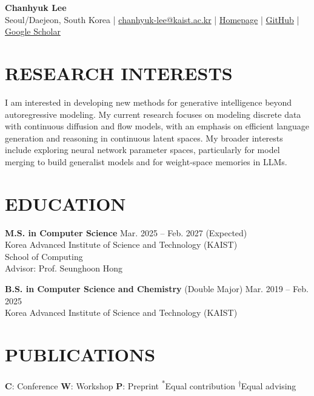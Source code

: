 \documentclass[a4paper,10pt]{extarticle}
\newcommand{\entryskip}{\smallskip}
\begin{document}
\fontsize{9.5}{11.4}\selectfont

\pagestyle{empty}

\begin{center}
    \textbf{\Large Chanhyuk Lee}\\[3pt]
    Seoul/Daejeon, South Korea | \href{mailto:chanhyuk-lee@kaist.ac.kr}{chanhyuk-lee@kaist.ac.kr} | \href{https://david3684.github.io}{Homepage} | \href{https://github.com/david3684}{GitHub} | \href{https://scholar.google.com/citations?user=mpSpDHcAAAAJ}{Google Scholar}
\end{center}

\section*{RESEARCH INTERESTS}
I am interested in developing new methods for generative intelligence beyond
autoregressive modeling. My current research focuses on modeling discrete data
with continuous diffusion and flow models, with an emphasis on efficient
language generation and reasoning in continuous latent spaces.
My broader interests include exploring neural network parameter spaces,
particularly for model merging to build generalist models and for weight-space
memories in LLMs.

\section*{EDUCATION}
\textbf{M.S. in Computer Science} \hfill Mar. 2025 -- Feb. 2027 (Expected) \\
Korea Advanced Institute of Science and Technology (KAIST) \\
School of Computing \\
Advisor: Prof. Seunghoon Hong

\entryskip
\textbf{B.S. in Computer Science and Chemistry} (Double Major) \hfill Mar. 2019 -- Feb. 2025 \\
Korea Advanced Institute of Science and Technology (KAIST)

\section*{PUBLICATIONS}
{\small \textbf{C}: Conference \quad \textbf{W}: Workshop \quad \textbf{P}: Preprint \quad \textsuperscript{*}Equal contribution \quad \textsuperscript{\ensuremath{\dagger}}Equal advising}
\end{document}
